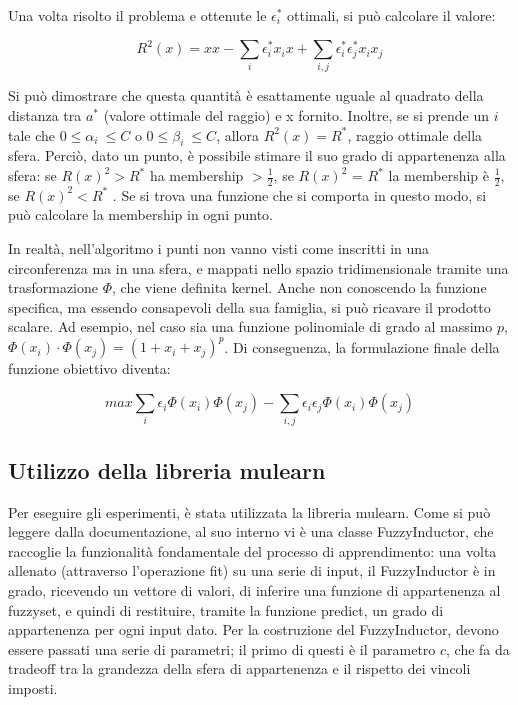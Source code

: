 \documentclass[12pt,a4paper]{report}
\begin{document}
Una volta risolto il problema e ottenute le $\epsilon_i^*$ ottimali, si può calcolare il valore:

\[ R^2(x) = xx - \sum_{i}\epsilon_i^*x_ix + \sum_{i,j}\epsilon_i^*\epsilon_j^*x_ix_j\]

Si può dimostrare che questa quantità è esattamente uguale al quadrato della distanza tra $a^*$ (valore ottimale del raggio) e x fornito. Inoltre,  se si prende un $i$ tale che $0 \leq \alpha_{i}\ \leq C$ o $0 \leq \beta_{i}\ \leq C$,  allora $R^2(x) = R^*$, raggio ottimale della sfera.
Perciò, dato un punto, è possibile stimare il suo grado di appartenenza alla sfera: se $R(x)^2 > R^*$ ha membership $>\frac{1}{2}$, se $R(x)^2$ = $R^*$ la membership è  $\frac{1}{2}$, se $R(x)^2  <R^*$ .
Se si trova una funzione che si comporta in questo modo, si può calcolare la membership in ogni punto.

In realtà, nell'algoritmo i punti non vanno visti come inscritti in una circonferenza ma in una sfera, e mappati nello spazio tridimensionale tramite una trasformazione $\Phi$, che viene definita kernel. Anche non conoscendo la funzione specifica, ma essendo consapevoli della sua famiglia, si può ricavare il prodotto scalare. Ad esempio, nel caso sia una funzione polinomiale di grado al massimo $p$, $\Phi(x_i)\cdot \Phi(x_j) = (1 + x_i + x_j)^p$.
Di conseguenza, la formulazione finale della funzione obiettivo diventa:

\[ max \sum_{i}\epsilon_i\Phi(x_i)\Phi(x_j) - \sum_{i,j}\epsilon_i\epsilon_j\Phi(x_i)\Phi(x_j)\]

\subsection{Utilizzo della libreria mulearn}

Per eseguire gli esperimenti, è stata utilizzata la libreria mulearn.\cite{mulearn}
Come si può leggere dalla documentazione, al suo interno vi è una classe FuzzyInductor, che raccoglie la funzionalità fondamentale del processo di apprendimento: una volta allenato (attraverso l'operazione fit) su una serie di input, il FuzzyInductor è in grado, ricevendo un vettore di valori, di inferire una funzione di appartenenza al fuzzyset, e quindi di restituire, tramite la funzione predict, un grado di appartenenza per ogni input dato.
Per la costruzione del FuzzyInductor, devono essere passati una serie di parametri; il primo di questi è il parametro $c$, che fa da tradeoff tra la grandezza della sfera di appartenenza e il rispetto dei vincoli imposti. 
\end{document}

